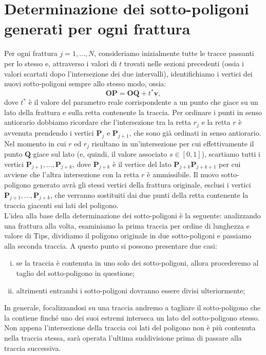 \documentclass[a4paper]{article}
\newcommand{\B}{\mathbf}
\begin{document}
\section{Determinazione dei sotto-poligoni generati per ogni frattura}
Per ogni frattura $j=1,\dots,N$, consideriamo inizialmente tutte le tracce passanti per lo stesso e, attraverso i valori di $t$ trovati nelle sezioni precedenti (ossia i valori scartati dopo l'intersezione dei due intervalli), identifichiamo i vertici dei nuovi sotto-poligoni sempre allo stesso modo, ossia:$$\B{OP}=\B{OQ}+t^*\B{v},$$ dove $t^*$ è il valore del parametro reale corrispondente a un punto che giace su un lato della frattura e sulla retta contenente la traccia. Per ordinare i punti in senso antiorario dobbiamo ricordare che l'intersezione tra la retta $r_j$ e la retta $r$ è avvenuta prendendo i vertici $\B{P}_j$ e $\B{P}_{j+1}$, che sono già ordinati in senso antiorario. Nel momento in cui $r$ ed $r_j$ risultano in un'intersezione per cui effettivamente il punto $\B{Q}$ giace sul lato (e, quindi, il valore associato $s\in[0,1]$), scartiamo tutti i vertici $\B{P}_{j+1},\dots,\B{P}_{j+k}$, dove $\B{P}_{j+k}$ è il vertice del lato $\B{P}_{j+k}\B{P}_{j+k+1}$ per cui avviene che l'altra intersezione con la retta $r$ è ammissibile. Il nuovo sotto-poligono generato avrà gli stessi vertici della frattura originale, esclusi i vertici $\B{P}_{j+1},\dots,\B{P}_{j+k}$, che verranno sostituiti dai due punti della retta contenente la traccia giacenti sui lati del poligono. 
\\ [2mm]
L'idea alla base della determinazione dei sotto-poligoni è la seguente: analizzando una frattura alla volta, esaminiamo la prima traccia per ordine di lunghezza e valore di Tips, dividiamo il poligono originale in due sotto-poligoni e passiamo alla seconda traccia. A questo punto si possono presentare due casi:
\begin{enumerate} [(i)]
\item  se la traccia è contenuta in uno solo dei sotto-poligoni, allora procederemo al taglio del sotto-poligono in questione;
\item altrimenti entrambi i sotto-poligoni dovranno essere divisi ulteriormente;
\end{enumerate}

In generale, focalizzandosi su una traccia andremo a tagliare il sotto-poligono che la contiene finché uno dei suoi estremi interseca un lato del sotto-poligono stesso. Non appena l'intersezione della traccia coi lati del poligono non è più contenuta nella traccia stessa, sarà operata l'ultima suddivisione prima di passare alla traccia successiva.\\
\end{document}

